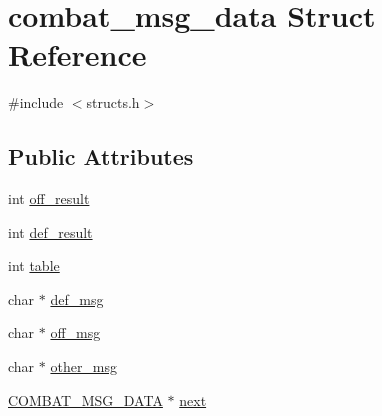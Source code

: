 \hypertarget{structcombat__msg__data}{\section{combat\-\_\-msg\-\_\-data Struct Reference}
\label{structcombat__msg__data}
}


{\ttfamily \#include $<$structs.\-h$>$}

\subsection*{Public Attributes}
\begin{DoxyCompactItemize}
\item 
int \hyperlink{structcombat__msg__data_a697ac169958277e61ff19f0429ad2e68}{off\-\_\-result}
\item 
int \hyperlink{structcombat__msg__data_acead0497fb7c26b5a855c45ffee56cf0}{def\-\_\-result}
\item 
int \hyperlink{structcombat__msg__data_a1eb0e986dc3309bcbdee77ec531f9cae}{table}
\item 
char $\ast$ \hyperlink{structcombat__msg__data_a08ef4044d6536017b04f0b3cdfa84ffb}{def\-\_\-msg}
\item 
char $\ast$ \hyperlink{structcombat__msg__data_a2430b7212ddc724ff684e8955dd11e64}{off\-\_\-msg}
\item 
char $\ast$ \hyperlink{structcombat__msg__data_a4bbb926f07588b7cd4d71febf58a63de}{other\-\_\-msg}
\item 
\hyperlink{structs_8h_af0e01cee4316ace63de94a34a27b0018}{C\-O\-M\-B\-A\-T\-\_\-\-M\-S\-G\-\_\-\-D\-A\-T\-A} $\ast$ \hyperlink{structcombat__msg__data_ae4b16621a8adddebba65dd955cbc5e1e}{next}
\end{DoxyCompactItemize}


